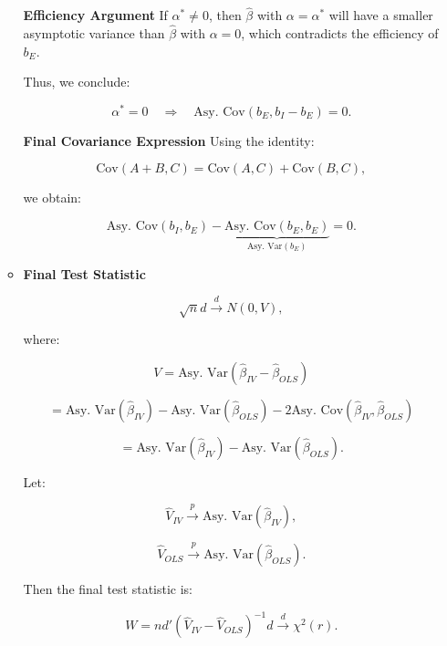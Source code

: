 \documentclass[12pt, oneside]{article}
\begin{document}
\begin{enumerate}
\begin{itemize}
            \textbf{Efficiency Argument}
            If \( \alpha^* \neq 0 \), then \( \hat{\beta} \) with \( \alpha = \alpha^* \) will have a smaller asymptotic variance than \( \hat{\beta} \) with \( \alpha = 0 \), which contradicts the efficiency of \( b_E \).
            
            Thus, we conclude:
            
            \[
            \alpha^* = 0 \quad \Rightarrow \quad \text{Asy. Cov}(b_E, b_I - b_E) = 0.
            \]
            
            \textbf{Final Covariance Expression}
            Using the identity:
            
            \[
            \text{Cov}(A + B, C) = \text{Cov}(A, C) + \text{Cov}(B, C),
            \]
            
            we obtain:
            
            \[
            \text{Asy. Cov}(b_I, b_E) - \underbrace{\text{Asy. Cov}(b_E, b_E)}_{\text{Asy. Var}(b_E)} = 0.
            \]
            
        \item \textbf{Final Test Statistic}

            \[
            \sqrt{n} d \xrightarrow{d} N(0, V),
            \]

            where:

            \[
            V = \text{Asy. Var}(\hat{\beta}_{IV} - \hat{\beta}_{OLS})
            \]

            \[
            = \text{Asy. Var}(\hat{\beta}_{IV}) - \text{Asy. Var}(\hat{\beta}_{OLS}) - 2 \text{Asy. Cov}(\hat{\beta}_{IV}, \hat{\beta}_{OLS})
            \]

            \[
            = \text{Asy. Var}(\hat{\beta}_{IV}) - \text{Asy. Var}(\hat{\beta}_{OLS}).
            \]

            Let:

            \[
            \hat{V}_{IV} \xrightarrow{p} \text{Asy. Var}(\hat{\beta}_{IV}),
            \]

            \[
            \hat{V}_{OLS} \xrightarrow{p} \text{Asy. Var}(\hat{\beta}_{OLS}).
            \]

            Then the final test statistic is:

            \[
            W = n d' (\hat{V}_{IV} - \hat{V}_{OLS})^{-1} d \xrightarrow{d} \chi^2(r).
            \]
        \end{itemize}
    \end{enumerate}
\end{document}
